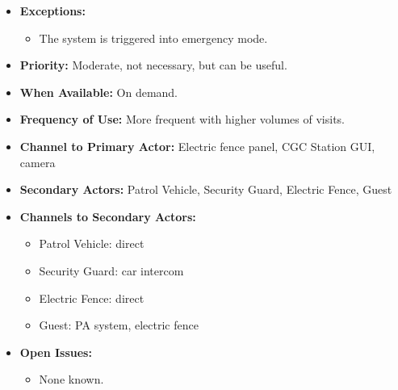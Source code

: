 \documentclass[12pt]{article}
\begin{document}
\begin{itemize}
        \item[]\textbf{Exceptions:}
            \begin{itemize}
                \item[] The system is triggered into emergency mode.
            \end{itemize}

        \item[]\textbf{Priority:}
            Moderate, not necessary, but can be useful.
            
        \item[]\textbf{When Available:}
            On demand.

        \item[]\textbf{Frequency of Use:}
            More frequent with higher volumes of visits.
            
        \item[]\textbf{Channel to Primary Actor:}
            Electric fence panel, CGC Station GUI, camera 

        \item[]\textbf{Secondary Actors:}
            Patrol Vehicle, Security Guard, Electric Fence, Guest
            
        \item[]\textbf{Channels to Secondary Actors:}
            \begin{itemize}
                \item[] Patrol Vehicle: direct
                \item[] Security Guard: car intercom
                \item[] Electric Fence: direct
                \item[] Guest: PA system, electric fence
            \end{itemize}

        \item[]\textbf{Open Issues:}
            \begin{itemize}
                \item[] None known.
            \end{itemize}
    \end{itemize}
    
\end{document}
